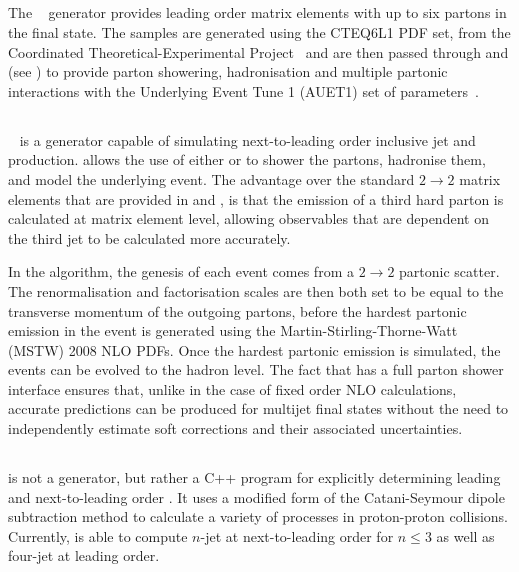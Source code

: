 \subsection{\Alpgen}
\label{sec:bg-theory:MC:Alpgen}
The \Alpgen~\cite{Mangano:2003:Alpgen} \MC generator provides leading order matrix elements with up to six partons in the final state.
The \Alpgen samples are generated using the CTEQ6L1 PDF set, from the Coordinated Theoretical-Experimental Project~\cite{Pumplin:2002:CTEQ6L1} and are then passed through \Herwig and \Jimmy (see ) to provide parton showering, hadronisation and multiple partonic interactions with the \ATLAS Underlying Event Tune 1 (AUET1) set of parameters~\cite{ATLAS-PHYS-PUB-2010-014}.

\subsection{\Powheg}
\label{sec:bg-theory:MC:Powheg}
\Powheg~\cite{Nason:2004:NLOMC,Frixione:2007:NLOPowheg,Alioli:2010:NLOPowheg} is a generator capable of simulating next-to-leading order inclusive jet and \dijet production.
\Powheg allows the use of either \Pythia or \Herwig to shower the partons, hadronise them, and model the underlying event.
The advantage over the standard $2\rightarrow2$ matrix elements that are provided in \Pythia and \Herwig, is that the emission of a third hard parton is calculated at matrix element level, allowing observables that are dependent on the third jet to be calculated more accurately.

In the \Powheg algorithm, the genesis of each event comes from a \QCD $2\rightarrow2$ partonic scatter. The renormalisation and factorisation scales are then both set to be equal to the transverse momentum of the outgoing partons, before the hardest partonic emission in the event is generated using the Martin-Stirling-Thorne-Watt (MSTW) 2008 NLO PDFs.
Once the hardest partonic emission is simulated, the events can be evolved to the hadron level.
The fact that \Powheg has a full parton shower interface ensures that, unlike in the case of fixed order NLO calculations, accurate predictions can be produced for multijet final states without the need to independently estimate soft corrections and their associated uncertainties.

\subsection{\NLOjetpp}
\label{sec:bg-theory:NLOjetpp}
\NLOjetpp is not a \MC generator, but rather a C++ program for explicitly determining leading and next-to-leading order .
It uses a modified form of the Catani-Seymour dipole subtraction method to calculate a variety of \QCD processes in proton-proton collisions.
Currently, \NLOjetpp is able to compute $n$-jet  at next-to-leading order for $n \leq 3$ as well as four-jet  at leading order.

